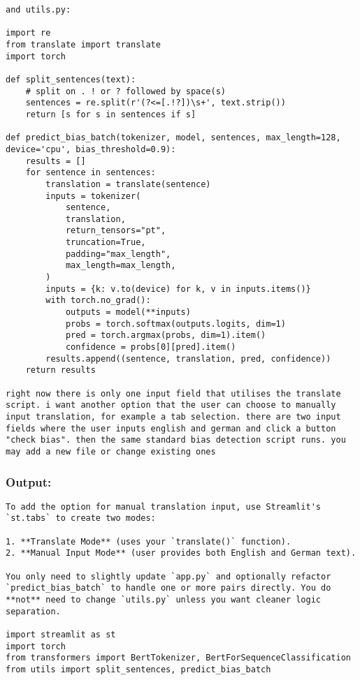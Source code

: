 \begin{appendices}
\begin{lstlisting}
and utils.py:

import re
from translate import translate
import torch

def split_sentences(text):
    # split on . ! or ? followed by space(s)
    sentences = re.split(r'(?<=[.!?])\s+', text.strip())
    return [s for s in sentences if s]

def predict_bias_batch(tokenizer, model, sentences, max_length=128, device='cpu', bias_threshold=0.9):
    results = []
    for sentence in sentences:
        translation = translate(sentence)
        inputs = tokenizer(
            sentence,
            translation,
            return_tensors="pt",
            truncation=True,
            padding="max_length",
            max_length=max_length,
        )
        inputs = {k: v.to(device) for k, v in inputs.items()}
        with torch.no_grad():
            outputs = model(**inputs)
            probs = torch.softmax(outputs.logits, dim=1)
            pred = torch.argmax(probs, dim=1).item()
            confidence = probs[0][pred].item()
        results.append((sentence, translation, pred, confidence))
    return results

right now there is only one input field that utilises the translate script. i want another option that the user can choose to manually input translation, for example a tab selection. there are two input fields where the user inputs english and german and click a button "check bias". then the same standard bias detection script runs. you may add a new file or change existing ones
\end{lstlisting}

\subsubsection{Output:}
\begin{lstlisting}
To add the option for manual translation input, use Streamlit's `st.tabs` to create two modes:

1. **Translate Mode** (uses your `translate()` function).
2. **Manual Input Mode** (user provides both English and German text).

You only need to slightly update `app.py` and optionally refactor `predict_bias_batch` to handle one or more pairs directly. You do **not** need to change `utils.py` unless you want cleaner logic separation.

import streamlit as st
import torch
from transformers import BertTokenizer, BertForSequenceClassification
from utils import split_sentences, predict_bias_batch


\end{lstlisting}
\end{appendices}
